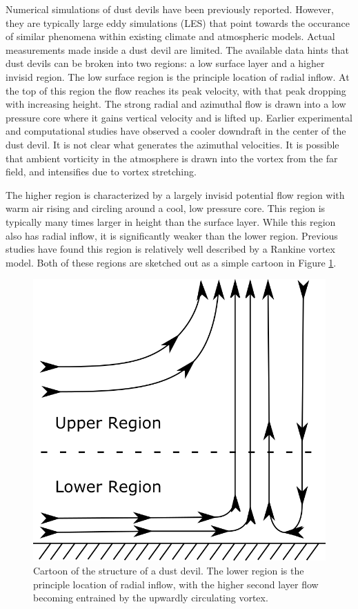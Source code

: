 Numerical simulations of dust devils have been previously
reported. However, they are typically large eddy simulations (LES) that point
towards the occurance of similar phenomena within existing climate and
atmospheric models\cite{QJ:QJ200513160722,doi:10.3137/ao.420105}. Actual
measurements made inside a dust devil 
are limited. The available data hints that dust devils can be broken
into two regions: a low surface layer and a higher invisid region. The
low surface region is the  principle location of radial inflow. 
At the top of this region the flow 
reaches its peak velocity, with that peak dropping with increasing height. 
The strong radial and azimuthal flow is drawn into a low pressure core 
where it gains vertical velocity and is lifted up. Earlier experimental and 
computational studies have observed a cooler downdraft in the center 
of the dust devil\cite{}. It is not clear what generates the azimuthal velocities. It is 
possible that ambient vorticity in the atmosphere is drawn into the
vortex from the far field, 
and intensifies due to vortex stretching. 

The higher region is characterized by a largely invisid potential flow region 
with warm air rising and circling around a cool, 
low pressure core. This region is typically many times larger in height than the
surface layer. While this region also has radial inflow, it is 
significantly weaker than the lower region. Previous studies have found 
this region is relatively well described by a Rankine vortex
model\cite{Sinclair1973}. Both of these regions are sketched out as a simple 
cartoon in Figure \ref{fig:cartoon}.

  \begin{figure}[!htb]
    \begin{center}
     \includegraphics[width = 10 cm]{figs/ground}
     \caption{Cartoon of the structure of a dust devil. The lower region
     is the principle location of radial inflow, with the higher second
     layer flow becoming entrained by the upwardly circulating vortex. }
     \label{fig:cartoon}
    \end{center}
  \end{figure}


